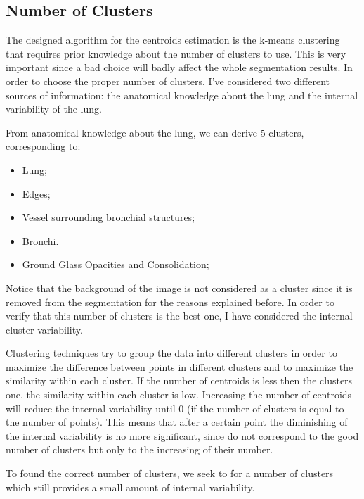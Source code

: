 \documentclass{standalone}
\begin{document}
	\subsection{Number of Clusters}
	
	The designed algorithm for the centroids estimation is the k-means clustering that requires prior knowledge about the number of clusters to use. This is very important since a bad choice will badly affect the whole segmentation results. In order to choose the proper number of clusters, I've considered two different sources of information: the anatomical knowledge about the lung and the internal variability of the lung.

	From anatomical knowledge about the lung, we can derive 5 clusters, corresponding to: 
	\begin{itemize}
		\item Lung; 
		
		\item  Edges;
		
		\item Vessel surrounding bronchial structures;
		
		
		\item Bronchi.
		
		\item  Ground Glass Opacities and Consolidation;
	\end{itemize}


	Notice that the background of the image is not considered as a cluster since it is removed from the segmentation for the reasons explained before.
	In order to verify that this number of clusters is the best one, I have considered the internal cluster variability.

	Clustering techniques try to group the data into different clusters in order to maximize the difference between points in different clusters and to maximize the similarity within each cluster. If the number of centroids is less then the clusters one, the similarity within each cluster is low. Increasing the number of centroids will reduce the internal variability until $0$ (if the number of clusters is equal to the number of points). 
	This means that after a certain point the diminishing of the internal variability is no more significant, since do not correspond to the good number of clusters but only to the increasing of their number.

	To found the correct number of clusters, we seek to for a number of clusters which still provides a small amount of internal variability. 
\end{document}
